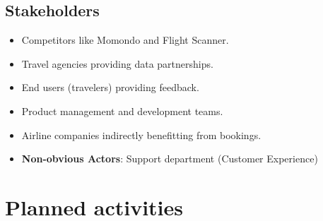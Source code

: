 \documentclass[a4paper]{article}
\begin{document}
\subsection{Stakeholders}
\begin{itemize}
    \item Competitors like Momondo and Flight Scanner.
    \item Travel agencies providing data partnerships.
    \item End users (travelers) providing feedback.
    \item Product management and development teams.
    \item Airline companies indirectly benefitting from bookings.
    \item \textbf{Non-obvious Actors}: Support department (Customer Experience)
\end{itemize}


\section{Planned activities}
\end{document}
